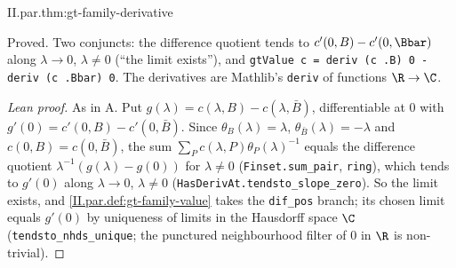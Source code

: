 \begin{theorem}
\end{theorem}
\begin{tfformal}{II.par.thm:gt-family-derivative}
\begin{tffidelity}
Proved. Two conjuncts: the difference quotient tends to $c'(0,B)-c'(0,\Bbar)$ along $\lambda\to0$, $\lambda\ne0$ (``the limit exists''), and \texttt{gtValue c = deriv (c .B) 0 - deriv (c .Bbar) 0}. The derivatives are Mathlib's \texttt{deriv} of functions $\R\to\C$.
\end{tffidelity}
\end{tfformal}
\begin{proof}[Lean proof]
As in A. Put $g(\lambda)=c(\lambda,B)-c(\lambda,\bar B)$, differentiable at $0$ with $g'(0)=c'(0,B)-c'(0,\bar B)$. Since $\theta_B(\lambda)=\lambda$, $\theta_{\bar B}(\lambda)=-\lambda$ and $c(0,B)=c(0,\bar B)$, the sum $\sum_Pc(\lambda,P)\theta_P(\lambda)^{-1}$ equals the difference quotient $\lambda^{-1}(g(\lambda)-g(0))$ for $\lambda\ne0$ (\texttt{Finset.sum\_pair}, \texttt{ring}), which tends to $g'(0)$ along $\lambda\to0$, $\lambda\ne0$ (\texttt{HasDerivAt.tendsto\_slope\_zero}). So the limit exists, and \cref{II.par.def:gt-family-value} takes the \texttt{dif\_pos} branch; its chosen limit equals $g'(0)$ by uniqueness of limits in the Hausdorff space $\C$ (\texttt{tendsto\_nhds\_unique}; the punctured neighbourhood filter of $0$ in $\R$ is non-trivial).
\end{proof}


